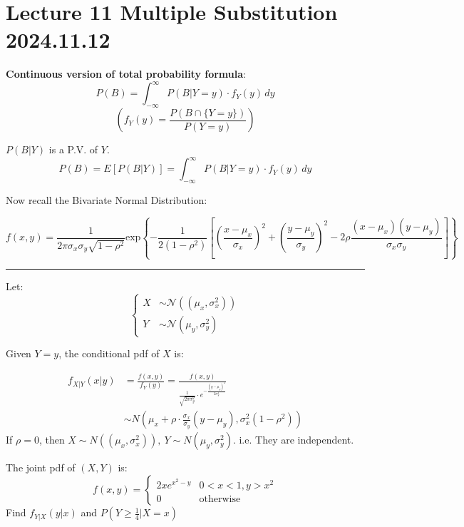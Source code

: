 \documentclass{article}
\begin{document}
\section{Lecture 11 Multiple Substitution 2024.11.12}


\begin{definition}
    \textbf{Continuous version of total probability formula}:
    \[ P(B) = \int_{-\infty}^{\infty}P(B|Y=y) \cdot f_{Y}(y) \, dy \]
    \[ \left(f_{Y}(y) = \frac{P(B\cap \{Y=y\})}{P(Y=y)}\right) \]

$ P(B|Y) $ is a P.V. of $Y$.
\[P(B) = E[P(B|Y)] = \int_{-\infty}^{\infty} P(B|Y=y) \cdot f_{Y}(y) \, dy\]

\end{definition}

Now recall the Bivariate Normal Distribution:

\[ f(x,y) = \frac{1}{2\pi \sigma_{x} \sigma_{y} \sqrt{1-\rho^{2}}} \text{exp} \left\{ -\frac{1}{2(1-\rho^{2})} \left[ \left( \frac{x-\mu_{x}}{\sigma_{x}} \right)^{2} + \left( \frac{y-\mu_{y}}{\sigma_{y}} \right)^{2} -2 \rho \frac{(x-\mu_{x})(y-\mu_{y})}{\sigma_{x} \sigma_{y}} \right] \right\} \]

\rule{35em}{0.05ex}

\bigskip

Let:
\[
\left\{
    \begin{aligned}
        X &\sim \mathcal{N} ((\mu_{x},\sigma_{x}^{2}))\\
        Y &\sim \mathcal{N} (\mu_{y}, \sigma_{y}^{2})
    \end{aligned}
\right.
\]

Given $Y = y$, the conditional pdf of $X$ is:

\begin{align*}
    f_{X|Y}(x|y) &= \frac{f(x,y)}{f_{Y}(y)} = \frac{f(x,y)}{\frac{1}{\sqrt{2\pi \sigma_{y}^{2}}} \cdot e^{-\frac{(y-\mu_{y})^{2}}{2\sigma_{y}^{2}}}}\\
                 &\sim N(\mu_{x} + \rho \cdot \frac{\sigma_{x}}{\sigma_{y}}(y-\mu_{y}), \sigma_{x}^{2}(1-\rho^{2})) 
\end{align*}
 If $\rho = 0$, then $X \sim N((\mu_{x},\sigma_{x}^{2})),\  Y \sim N(\mu_{y}, \sigma_{y}^{2})$.
 i.e. They are independent.

\begin{quiz}
    The joint pdf of $(X,Y)$ is:
    \[ f(x,y) = \begin{cases}
        2xe^{x^{2}-y} & 0<x<1,y>x^{2}\\
        0 & \text{otherwise}
    \end{cases} \]
Find $f_{Y|X}(y|x)$ and $P(Y\geq \frac{1}{4} | X=x)$
\end{quiz}
\end{document}
